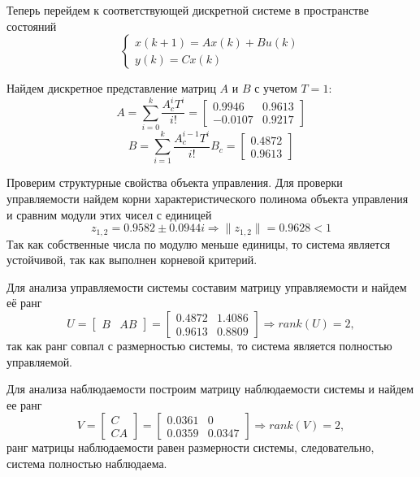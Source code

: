Теперь перейдем к соответствующей дискретной системе в пространстве состояний
\begin{equation}
	\label{1_d_oc}
	\begin{cases}
		x(k+1) = Ax(k) + Bu(k)\\
		y(k) = Cx(k)
	\end{cases}
\end{equation}

Найдем дискретное представление матриц $A$ и $B$ с учетом $T = 1$:
\begin{equation}
	A = \sum \limits_{i=0}^k \frac{A_c^iT^i}{i!} =
	\begin{bmatrix}
		0.9946&	0.9613\\
		-0.0107&	0.9217
	\end{bmatrix}
\end{equation}
\begin{equation}
	B = \sum \limits_{i=1}^k \frac{A_c^{i-1}T^i}{i!}B_c =
	\begin{bmatrix}
		0.4872\\
		0.9613
	\end{bmatrix}
\end{equation}

Проверим структурные свойства объекта управления.
Для проверки управляемости найдем корни характеристического полинома объекта управления и сравним модули этих чисел с единицей
\begin{equation}
	z_{1,2} = 0.9582 \pm 0.0944i \Rightarrow \|z_{1, 2} \| = 0.9628 < 1
\end{equation}
Так как собственные числа по модулю меньше единицы, то система является устойчивой, так как выполнен корневой критерий.

Для анализа управляемости системы составим матрицу управляемости и найдем её ранг
\begin{equation}
	U = \begin{bmatrix}
		B & AB
	\end{bmatrix} = \begin{bmatrix}
	0.4872 &	1.4086\\
	0.9613 &	0.8809
	\end{bmatrix} \Rightarrow rank\left(U\right) = 2,
\end{equation}
так как ранг совпал с размерностью системы, то система является полностью управляемой.

Для анализа наблюдаемости построим матрицу наблюдаемости системы и найдем ее ранг
\begin{equation}
	V = \begin{bmatrix}
		C\\
		CA
	\end{bmatrix} = \begin{bmatrix}
	0.0361 &	0\\
	0.0359 &	0.0347
	\end{bmatrix} \Rightarrow rank \left(V\right) = 2,
\end{equation}
ранг матрицы наблюдаемости равен размерности системы, следовательно, система полностью наблюдаема.

